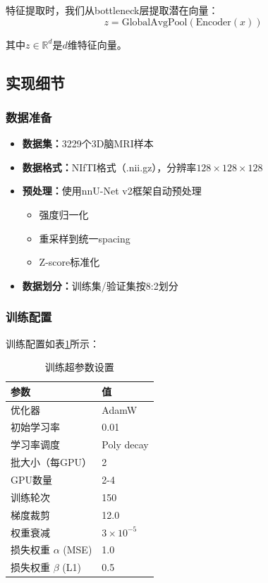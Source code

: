 \documentclass[11pt,a4paper]{article}
\begin{document}
特征提取时，我们从bottleneck层提取潜在向量：
\begin{equation}
    z = \text{GlobalAvgPool}(\text{Encoder}(x))
\end{equation}

其中$z \in \mathbb{R}^d$是$d$维特征向量。

\subsection{实现细节}

\subsubsection{数据准备}

\begin{itemize}
    \item \textbf{数据集：}3229个3D脑MRI样本
    \item \textbf{数据格式：}NIfTI格式（.nii.gz），分辨率$128\times128\times128$
    \item \textbf{预处理：}使用nnU-Net v2框架自动预处理
    \begin{itemize}
        \item 强度归一化
        \item 重采样到统一spacing
        \item Z-score标准化
    \end{itemize}
    \item \textbf{数据划分：}训练集/验证集按8:2划分
\end{itemize}

\subsubsection{训练配置}

训练配置如表\ref{tab:training_config}所示：

\begin{table}[htbp]
    \centering
    \caption{训练超参数设置}
    \label{tab:training_config}
    \begin{tabular}{ll}
        \toprule
        \textbf{参数} & \textbf{值} \\
        \midrule
        优化器 & AdamW \\
        初始学习率 & 0.01 \\
        学习率调度 & Poly decay \\
        批大小（每GPU） & 2 \\
        GPU数量 & 2-4 \\
        训练轮次 & 150 \\
        梯度裁剪 & 12.0 \\
        权重衰减 & $3\times10^{-5}$ \\
        损失权重 $\alpha$ (MSE) & 1.0 \\
        损失权重 $\beta$ (L1) & 0.5 \\
        \bottomrule
    \end{tabular}
\end{table}
\end{document}
